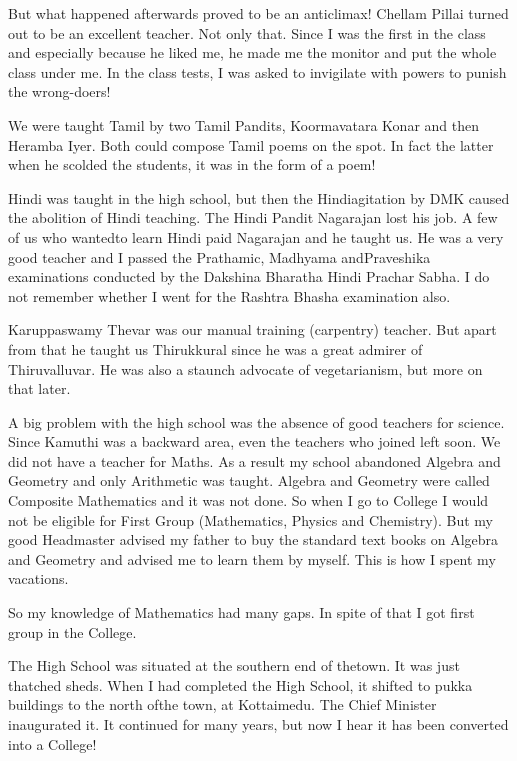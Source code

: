 But what happened afterwards proved to be an anticlimax! Chellam Pillai 
turned out to be an excellent teacher. Not only that. Since I was the 
first in the class and especially because he liked me, he made me the 
monitor and put the whole class under me. In the class tests, I was 
asked to invigilate with powers to punish the wrong-doers!

We were taught Tamil by two Tamil Pandits, Koormavatara Konar and then 
Heramba Iyer. Both could compose Tamil poems on the spot. In fact the 
latter when he scolded the students, it was in the form of a poem!

Hindi was taught in the high school, but then the Hindi\break agitation by DMK 
caused the abolition of Hindi teaching. The Hindi Pandit Nagarajan lost 
his job. A few of us who wanted\break to learn Hindi paid Nagarajan and he 
taught us. He was a very good teacher and I passed the Prathamic, 
Madhyama and\break Praveshika examinations conducted by the Dakshina Bharatha 
Hindi Prachar Sabha. I do not remember whether I went for the Rashtra 
Bhasha examination also.

Karuppaswamy Thevar was our manual training (carpentry) teacher. But 
apart from that he taught us Thirukkural since he was a great admirer of 
Thiruvalluvar. He was also a staunch advoca\-te of vegetarianism, but more 
on that later.
 
A big problem with the high school was the absence of good teachers for 
science. Since Kamuthi was a backward area, even the teachers who joined 
left soon. We did not have a teacher for Maths. As a result my school 
abandoned Algebra and Geometry and only Arithmetic was taught. Algebra 
and Geometry were called Composite Mathematics and it was not done. So 
when I go to College I would not be eligible for First Group 
(Mathematics, Physics and Chemistry). But my good Headmaster advised my 
father to buy the standard text books on Algebra and Geometry and 
advised me to learn them by myself. This is how I spent my vacations.

So my knowledge of Mathematics had many gaps. In spite of that I got 
first group in the College.

The High School was situated at the southern end of the\break town. It was 
just thatched sheds. When I had completed the High School, it shifted to 
pukka buildings to the north of\break the town, at Kottaimedu. The Chief 
Minister inaugurated it. It continued for many years, but now I hear it 
has been converted into a College!

